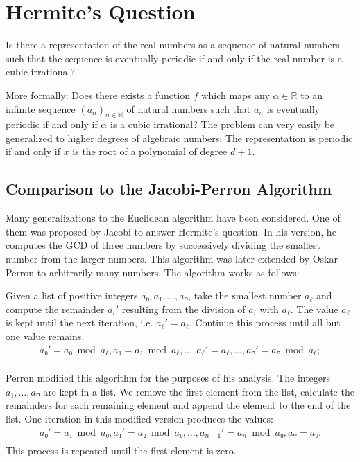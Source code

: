 \chapter{Hermite's Question}

\begin{problem}
  Is there a representation of the real numbers as a sequence of natural
  numbers such that the sequence is eventually periodic if and only if the real
  number is a cubic irrational?
\end{problem}

More formally: Does there exists a function $f$ which maps any $α ∈ ℝ$ to an
infinite sequence $(a_n)_{n ∈ ℕ}$ of natural numbers such that $a_n$ is
eventually periodic if and only if $α$ is a cubic irrational?
The problem can very easily be generalized to higher degrees of algebraic numbers:
The representation is periodic if and only if $x$ is the root of a polynomial of degree $d + 1$.

\section{Comparison to the Jacobi-Perron Algorithm}

Many generalizations to the Euclidean algorithm have been considered.
One of them was proposed by Jacobi to answer Hermite's question.
In his version, he computes the GCD of three numbers by successively dividing
the smallest number from the larger numbers.
This algorithm was later extended by Oskar Perron to arbitrarily many numbers.
The algorithm works as follows:

Given a list of positive integers $a₀, a₁, …, aₙ$, take the smallest number $a_ℓ$
and compute the remainder $a_i'$ resulting from the division of $a_i$ with $a_ℓ$.
The value $a_ℓ$ is kept until the next iteration, i.e. $a_ℓ' = a_ℓ$.
Continue this process until all but one value remains.
\begin{align*}
  a₀' = a₀ \bmod a_ℓ, a₁ = a₁ \bmod a_ℓ, …, a_ℓ' = a_ℓ, …, aₙ' = aₙ \bmod a_ℓ; \\
\end{align*}

Perron modified this algorithm for the purposes of his analysis.
The integers $a₁, …, aₙ$ are kept in a list.
We remove the first element from the list, calculate the remainders for each
remaining element and append the element to the end of the list.
One iteration in this modified version produces the values:
\begin{align*}
  a₀' = a₁ \bmod a₀, a₁' = a₂ \bmod a₀, …, a_{n-1}' = a_n \bmod a₀, aₙ = a₀. \\
\end{align*}
This process is repeated until the first element is zero.

